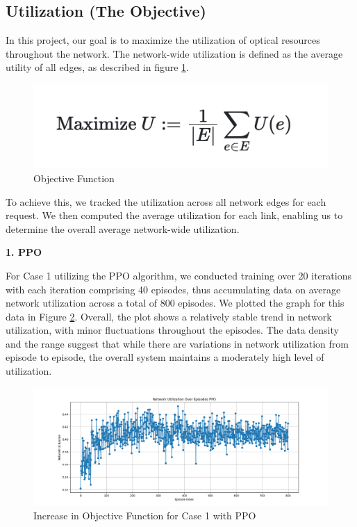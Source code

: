 \documentclass[conference]{IEEEtran}
\begin{document}
\subsection{Utilization (The Objective)}

In this project, our goal is to maximize the utilization of optical resources throughout the network. The network-wide utilization is defined as the average utility of all edges, as described in figure \ref{fig:equation_obj}.

\begin{figure}[htp]
    \centering
    \includegraphics[scale=0.6]{images/equation_objective.png}
    \caption{Objective Function}
    \label{fig:equation_obj}
\end{figure}

To achieve this, we tracked the utilization across all network edges for each request. We then computed the average utilization for each link, enabling us to determine the overall average network-wide utilization.

\textbf{1. PPO}

For Case 1 utilizing the PPO algorithm, we conducted training over 20 iterations with each iteration comprising 40 episodes, thus accumulating data on average network utilization across a total of 800 episodes. We plotted the graph for this data in Figure \ref{fig:obj_c1_ppo}. Overall, the plot shows a relatively stable trend in network utilization, with minor fluctuations throughout the episodes. The data density and the range suggest that while there are variations in network utilization from episode to episode, the overall system maintains a moderately high level of utilization.

\begin{figure}[htp]
    \centering
    \includegraphics[width=\columnwidth]{images/obj_fn_case1_PPO.png}
    \caption{Increase in Objective Function for Case 1 with PPO}
    \label{fig:obj_c1_ppo}
\end{figure}
\end{document}
